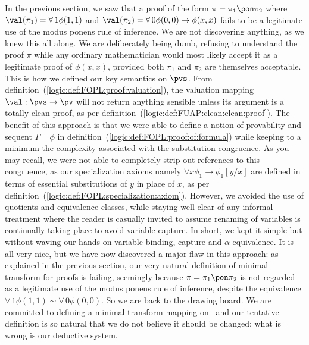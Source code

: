 In the previous section, we saw that a proof of the form
$\pi=\pi_{1}\pon\pi_{2} $ where $\val(\pi_{1})=\forall\,1\phi(1,1)$
and $\val(\pi_{2})=\forall\,0\phi(0,0)\to\phi(x,x)$ fails to be a
legitimate use of the modus ponens rule of inference. We are not
discovering anything, as we knew this all along. We are deliberately
being dumb, refusing to understand the proof $\pi$ while any
ordinary mathematician would most likely accept it as a legitimate
proof of $\phi(x,x)$, provided both $\pi_{1}$ and $\pi_{2}$ are
themselves acceptable. This is how we defined our key semantics on
$\pvs$. From definition~(\ref{logic:def:FOPL:proof:valuation}), the
valuation mapping $\val:\pvs\to\pv$ will not return anything
sensible unless its argument is a totally clean proof, as per
definition~(\ref{logic:def:FUAP:clean:clean:proof}). The benefit of
this approach is that we were able to define a notion of provability
and sequent $\Gamma\vdash\phi$  in
definition~(\ref{logic:def:FOPL:proof:of:formula}) while keeping to
a minimum the complexity associated with the substitution
congruence. As you may recall, we were not able to completely strip
out references to this congruence, as our specialization axioms
namely $\forall x\phi_{1}\to\phi_{1}[y/x]$ are defined in terms of
essential substitutions of $y$ in place of $x$, as per
definition~(\ref{logic:def:FOPL:specialization:axiom}). However, we
avoided the use of quotients and equivalence classes, while staying
well clear of any informal treatment where the reader is casually
invited to assume renaming of variables is continually taking place
to avoid variable capture. In short, we kept it simple but without
waving our hands on variable binding, capture and
$\alpha$-equivalence. It is all very nice, but we have now
discovered a major flaw in this approach: as explained in the
previous section, our very natural definition of minimal transform
for proofs is failing, seemingly because $\pi=\pi_{1}\pon\pi_{2}$ is
not regarded as a legitimate use of the modus ponens rule of
inference, despite the equivalence
$\forall\,1\phi(1,1)\sim\forall\,0\phi(0,0)$. So we are back to the
drawing board. We are committed to defining a minimal transform
mapping on \pvs\ and our tentative definition is so natural that we
do not believe it should be changed: what is wrong is our deductive
system.


